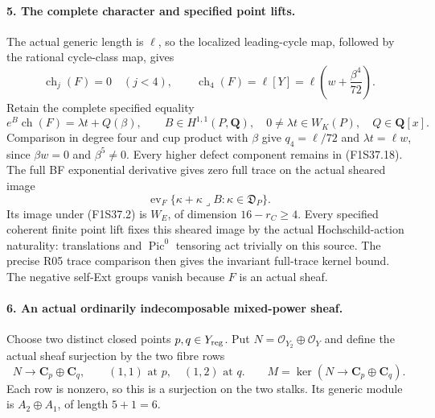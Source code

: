 \paragraph{5. The complete character and specified point lifts.}
The actual generic length is $\ell$,
so the localized leading-cycle map,
followed by the rational cycle-class map,
gives
\[
 \operatorname{ch}_j(F)=0\quad(j<4),\qquad
 \operatorname{ch}_4(F)
       =\ell[Y]=\ell\left(w+\frac{\beta^4}{72}\right).
 \tag{F1S37.17}
\]
Retain the complete specified equality
\[
 e^B\operatorname{ch}(F)=\lambda t+Q(\beta),
 \qquad B\in H^{1,1}(P,\mathbf Q),\quad
 0\ne\lambda t\in W_K(P),\quad Q\in\mathbf Q[x].
 \tag{F1S37.18}
\]
Comparison in degree four and cup product
with $\beta$ give $q_4=\ell/72$ and
$\lambda t=\ell w$, since $\beta w=0$
and $\beta^5\ne0$. Every higher defect
component remains in (F1S37.18).
The full BF exponential derivative gives
zero full trace on the actual sheared image
\[
 \operatorname{ev}_F
  \{\kappa+\kappa\mathbin{\lrcorner}B:
                                      \kappa\in\mathfrak D_P\}.
 \tag{F1S37.19}
\]
Its image under (F1S37.2) is $W_E$,
of dimension $16-r_C\ge4$.
Every specified coherent finite point
lift fixes this sheared image by the
actual Hochschild-action naturality:
translations and $\operatorname{Pic}^0$
tensoring act trivially on this source.
The precise R05 trace comparison then
gives the invariant full-trace kernel
bound. The negative self-Ext groups
vanish because $F$ is an actual sheaf.

\paragraph{6. An actual ordinarily indecomposable mixed-power sheaf.}
Choose two distinct closed points
$p,q\in Y_{\rm reg}$. Put
$N=\mathcal O_{Y_2}\oplus\mathcal O_Y$
and define the actual sheaf surjection
by the two fibre rows
\[
 N\longrightarrow\mathbf C_p\oplus\mathbf C_q,
 \qquad (1,1)\text{ at }p,\quad(1,2)\text{ at }q.
 \qquad M=\ker(N\longrightarrow\mathbf C_p\oplus\mathbf C_q).
 \tag{F1S37.20}
\]
Each row is nonzero, so this is a
surjection on the two stalks. Its
generic module is $A_2\oplus A_1$,
of length $5+1=6$.

